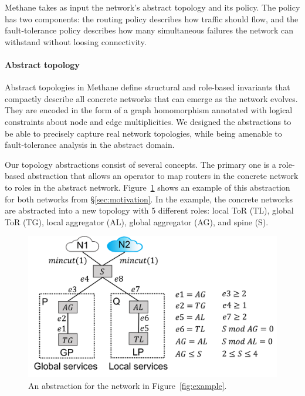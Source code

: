\documentclass[numbers, 10pt, preprint]{sigplanconf}
\newcommand{\sysname}{{\small \sf Methane}\xspace}
\newcommand{\para}[1]{\paragraph*{\textbf{#1}}}
\begin{document}

\sysname takes as input the network's abstract topology and its policy. The policy has two components: the routing policy describes how traffic should flow, and the fault-tolerance policy describes how many simultaneous failures the network can withstand without loosing connectivity.

\para{Abstract topology}
Abstract topologies in \sysname define structural and role-based invariants that compactly describe all concrete networks that can emerge as the network evolves. They are encoded in the form of a graph homomorphism annotated with logical constraints about node and edge multiplicities.
%
We designed the abstractions to be able to precisely capture real network topologies, while being amenable to fault-tolerance analysis in the abstract domain.


Our topology abstractions consist of several concepts.
The primary one is a role-based abstraction that allows an operator to map routers in the concrete network to roles in the abstract network. Figure~\ref{fig:example3} shows an example of this abstraction for both networks from \S\ref{sec:motivation}. In the example, the concrete networks are abstracted into a new topology with 5 different roles: local ToR (TL), global ToR (TG), local aggregator (AL), global aggregator (AG), and spine (S).

\begin{figure}[t!]
  \centering
  \includegraphics[width=\columnwidth]{figures/example3}
  \vspace{-2em}
  \caption{An abstraction for the network in Figure~\ref{fig:example}.}
  \label{fig:example3}
  \vspace{-1em}
\end{figure}
\end{document}
